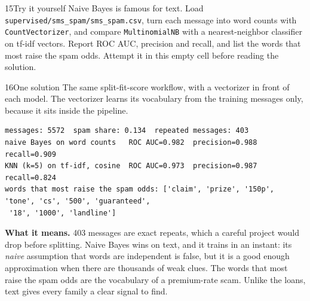 
\begin{labquestion}{15}{Try it yourself}
Naive Bayes is famous for text. Load \texttt{supervised/\allowbreak sms\_spam/\allowbreak sms\_spam.csv}, turn each message into word counts with \texttt{CountVectorizer}, and compare \texttt{MultinomialNB} with a nearest-neighbor classifier on tf-idf vectors. Report ROC AUC, precision and recall, and list the words that most raise the spam odds. Attempt it in this empty cell before reading the solution.
\end{labquestion}

\begin{labquestion}{16}{One solution}
The same split-fit-score workflow, with a vectorizer in front of each model. The vectorizer learns its vocabulary from the training messages only, because it sits inside the pipeline.
\end{labquestion}
\begin{labanswer}

\begin{refoutput}
\begin{lstlisting}[style=utpterminal]
messages: 5572  spam share: 0.134  repeated messages: 403
naive Bayes on word counts   ROC AUC=0.982  precision=0.988  recall=0.909
KNN (k=5) on tf-idf, cosine  ROC AUC=0.973  precision=0.987  recall=0.824
words that most raise the spam odds: ['claim', 'prize', '150p', 'tone', 'cs', '500', 'guaranteed',
 '18', '1000', 'landline']
\end{lstlisting}
\end{refoutput}

\textbf{What it means.} 403 messages are exact repeats, which a careful project would drop before splitting. Naive Bayes wins on text, and it trains in an instant: its \emph{naive} assumption that words are independent is false, but it is a good enough approximation when there are thousands of weak clues. The words that most raise the spam odds are the vocabulary of a premium-rate scam. Unlike the loans, text gives every family a clear signal to find.
\end{labanswer}


